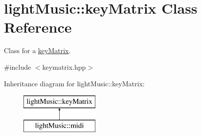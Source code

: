 \hypertarget{classlight_music_1_1key_matrix}{}\section{light\+Music\+:\+:key\+Matrix Class Reference}
\label{classlight_music_1_1key_matrix}


Class for a \hyperlink{classlight_music_1_1key_matrix}{key\+Matrix}.  




{\ttfamily \#include $<$keymatrix.\+hpp$>$}

Inheritance diagram for light\+Music\+:\+:key\+Matrix\+:\begin{figure}[H]
\begin{center}
\leavevmode
\includegraphics[height=2.000000cm]{classlight_music_1_1key_matrix}
\end{center}
\end{figure}

